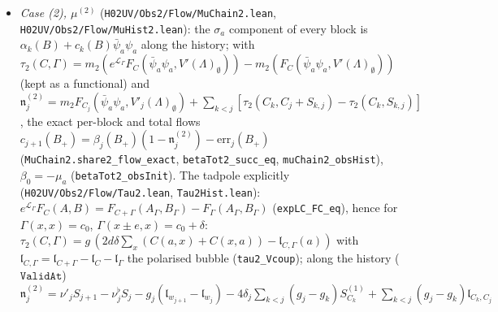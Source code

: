 \documentclass[11pt]{amsart}
\theoremstyle{definition}
\theoremstyle{remark}
\numberwithin{equation}{section}
\begin{document}
\begin{itemize}
  \texttt{mass2\_expLC\_add\_J}); $e^{\mathcal L_\Gamma}F$ only depends on $\Gamma|_{Y\times Y}$ for $F\in\mathcal N(Y)$
  (\texttt{expLC\_congr\_NX}); on a box of radius $R\le h$ around $x_0$, $C-C(x_0,x_0)$ agrees with a covariance with Gram
  constant $\gamma'^2=16dK^2R\gamma^2/h$ at all scales $\le R$ (smooth cut-off, \texttt{gram\_loc}), and
  $\|e^{\mathcal L_R}F-F\|_{T(\ell)}\le(\gamma/\ell)^2\|F\|_{T(2\ell)}$ (\texttt{tNorm\_expLC\_sub\_le}); so
  $|m(e^{\mathcal L_{S+C}}F)-m(e^{\mathcal L_S}F)|\le M_\sigma(\gamma'_C/2\sigma)^2\|F\|_{T(4\sigma)}$ (\texttt{pauli\_lip\_loc}).
  For the product parts ($\|\cdot\|\le C_P(L)r_k(r_km_V+m_W)$, \texttt{prod\_raw\_step}) with $R=10L^{k+1}$ this gives the
  decay $(8/(7L))^{j-k}$ (\texttt{delta\_hist\_le}) and \texttt{ProdBd} with ratio $q=2/L$ (\texttt{prodBd\_hist});
  hence the relative $\sigma_a$ flow of \texttt{Spin2.thm\_obs\_rel} holds under the master constants with \texttt{ProdBd} discharged, \emph{unconditionally}.
  The Case~(2) increment bound \texttt{delta\_hist\_le2} ($m_2$) is proved in the same (generic) form.
\item \emph{Case (2), $\mu^{(2)}$} (\texttt{H02UV/Obs2/Flow/MuChain2.lean}, \texttt{H02UV/Obs2/Flow/MuHist2.lean}): the $\sigma_a$ component of
  every block is $\alpha_k(B)+c_k(B)\bar\psi_a\psi_a$ along the history; with $\tau_2(C,\Gamma)=m_2(e^{\mathcal L_\Gamma}
  F_C(\bar\psi_a\psi_a,V'(\Lambda)_\emptyset))-m_2(F_C(\bar\psi_a\psi_a,V'(\Lambda)_\emptyset))$ (kept as a functional) and
  $\mathfrak n^{(2)}_j=m_2F_{C_j}(\bar\psi_a\psi_a,V'_j(\Lambda)_\emptyset)+\sum_{k<j}[\tau_2(C_k,C_j+S_{k,j})-\tau_2(C_k,S_{k,j})]$,
  the exact per-block and total flows $c_{j+1}(B_+)=\beta_j(B_+)(1-\mathfrak n^{(2)}_j)-\mathrm{err}_j(B_+)$
  (\texttt{MuChain2.share2\_flow\_exact}, \texttt{betaTot2\_succ\_eq}, \texttt{muChain2\_obsHist}), $\beta_0=-\mu_a$
  (\texttt{betaTot2\_obsInit}). The tadpole explicitly (\texttt{H02UV/Obs2/Flow/Tau2.lean}, \texttt{Tau2Hist.lean}):
  $e^{\mathcal L_\Gamma}F_C(A,B)=F_{C+\Gamma}(A_\Gamma,B_\Gamma)-F_\Gamma(A_\Gamma,B_\Gamma)$ (\texttt{expLC\_FC\_eq}), hence
  for $\Gamma(x,x)=c_0$, $\Gamma(x\pm e,x)=c_0+\delta$: $\tau_2(C,\Gamma)=g\,(2d\delta\sum_x(C(a,x)+C(x,a))-\mathfrak l_{C,\Gamma}(a))$
  with $\mathfrak l_{C,\Gamma}=\mathfrak l_{C+\Gamma}-\mathfrak l_C-\mathfrak l_\Gamma$ the polarised bubble
  (\texttt{tau2\_Vcoup}); along the history ($\mathtt{ValidAt}$) $\mathfrak n^{(2)}_j=\nu'_jS_{j+1}-\nu^\flat_jS_j
  -g_j(\mathfrak l_{w_{j+1}}-\mathfrak l_{w_j})-4\delta_j\sum_{k<j}(g_j-g_k)S^{(1)}_{C_k}+\sum_{k<j}(g_j-g_k)\mathfrak l_{C_k,C_j}$

\end{itemize}
\end{document}
